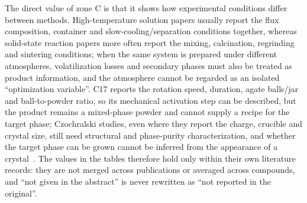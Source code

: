 The direct value of zone C is that it shows how experimental conditions differ between methods. High-temperature solution papers usually report the flux composition, container and slow-cooling/separation conditions together, whereas solid-state reaction papers more often report the mixing, calcination, regrinding and sintering conditions; when the same system is prepared under different atmospheres, volatilization losses and secondary phases must also be treated as product information, and the atmosphere cannot be regarded as an isolated ``optimization variable''\cite{redhammer2003beta,zou2021crystal,zou2019anti}. C17 reports the rotation speed, duration, agate balls/jar and ball-to-powder ratio, so its mechanical activation step can be described, but the product remains a mixed-phase powder and cannot supply a recipe for the target phase; Czochralski studies, even where they report the charge, crucible and crystal size, still need structural and phase-purity characterization, and whether the target phase can be grown cannot be inferred from the appearance of a crystal~\cite{tzvetkov2001effects,pang2005study,leonyuk1999high,shoudu1999czochralski}. The values in the tables therefore hold only within their own literature records: they are not merged across publications or averaged across compounds, and ``not given in the abstract'' is never rewritten as ``not reported in the original''.
